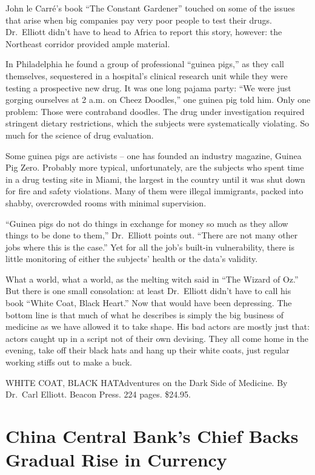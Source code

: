 ﻿\documentclass[12pt]{article}
\begin{document}
John le Carr\'e's book ``The Constant Gardener'' touched on some of the issues that arise when big
companies pay very poor people to test their drugs. Dr.~Elliott didn't have to head to Africa to
report this story, however: the Northeast corridor provided ample material.

In Philadelphia he found a group of professional ``guinea pigs,'' as they call themselves,
sequestered in a hospital's clinical research unit while they were testing a prospective new drug.
It was one long pajama party: ``We were just gorging ourselves at 2 a.m. on Cheez Doodles,'' one
guinea pig told him. Only one problem: Those were contraband doodles. The drug under investigation
required stringent dietary restrictions, which the subjects were systematically violating. So much
for the science of drug evaluation.

Some guinea pigs are activists -- one has founded an industry magazine, Guinea Pig Zero. Probably
more typical, unfortunately, are the subjects who spent time in a drug testing site in Miami, the
largest in the country until it was shut down for fire and safety violations. Many of them were
illegal immigrants, packed into shabby, overcrowded rooms with minimal supervision.

``Guinea pigs do not do things in exchange for money so much as they allow things to be done to
them,'' Dr.~Elliott points out. ``There are not many other jobs where this is the case.'' Yet for
all the job's built-in vulnerability, there is little monitoring of either the subjects' health or
the data's validity.

What a world, what a world, as the melting witch said in ``The Wizard of Oz.'' But there is one
small consolation: at least Dr.~Elliott didn't have to call his book ``White Coat, Black Heart.''
Now that would have been depressing. The bottom line is that much of what he describes is simply the
big business of medicine as we have allowed it to take shape. His bad actors are mostly just that:
actors caught up in a script not of their own devising. They all come home in the evening, take off
their black hats and hang up their white coats, just regular working stiffs out to make a buck.

WHITE COAT, BLACK HATAdventures on the Dark Side of Medicine. By Dr.~Carl Elliott. Beacon Press. 224
pages. \$24.95.

\section{China Central Bank's Chief Backs Gradual Rise in Currency}
\end{document}

